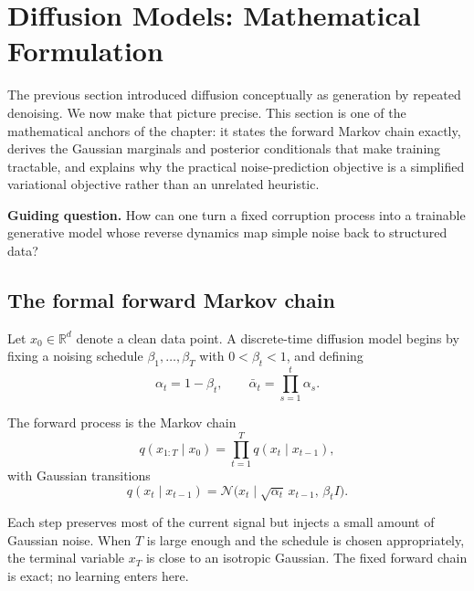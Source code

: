 

\section{Diffusion Models: Mathematical Formulation}

The previous section introduced diffusion conceptually as generation by repeated denoising.
We now make that picture precise.
This section is one of the mathematical anchors of the chapter: it states the forward Markov chain exactly, derives the Gaussian marginals and posterior conditionals that make training tractable, and explains why the practical noise-prediction objective is a simplified variational objective rather than an unrelated heuristic.

\medskip

\noindent
\textbf{Guiding question.}
How can one turn a fixed corruption process into a trainable generative model whose reverse dynamics map simple noise back to structured data?

\subsection*{The formal forward Markov chain}

Let $x_0\in\mathbb{R}^d$ denote a clean data point.
A discrete-time diffusion model begins by fixing a noising schedule $\beta_1,\dots,\beta_T$ with $0<\beta_t<1$, and defining
\[
\alpha_t = 1-\beta_t,
\qquad
\bar\alpha_t = \prod_{s=1}^t \alpha_s.
\]

\begin{definition}
The forward process is the Markov chain
\[
q(x_{1:T}\mid x_0)=\prod_{t=1}^T q(x_t\mid x_{t-1}),
\]
with Gaussian transitions
\[
q(x_t\mid x_{t-1})
=
\mathcal{N}\!\bigl(x_t\mid \sqrt{\alpha_t}\,x_{t-1},\,\beta_t I\bigr).
\]
\end{definition}

Each step preserves most of the current signal but injects a small amount of Gaussian noise.
When $T$ is large enough and the schedule is chosen appropriately, the terminal variable $x_T$ is close to an isotropic Gaussian.
The fixed forward chain is exact; no learning enters here.

